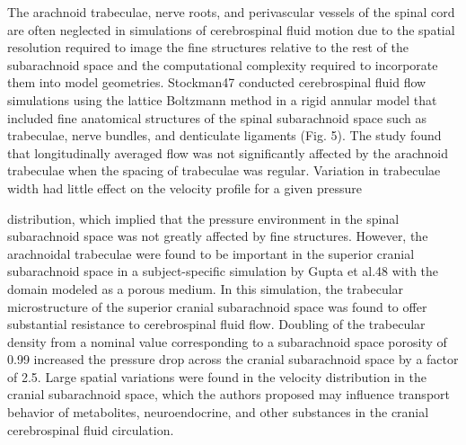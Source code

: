 \documentclass{report}
\begin{document}
The arachnoid trabeculae, nerve roots, and
perivascular vessels of the spinal cord are often
neglected in simulations of cerebrospinal fluid
motion due to the spatial resolution required to
image the fine structures relative to the rest of the
subarachnoid space and the computational complexity
required to incorporate them into model geometries.
Stockman47 conducted cerebrospinal fluid flow
simulations using the lattice Boltzmann method in a
rigid annular model that included fine anatomical
structures of the spinal subarachnoid space such as
trabeculae, nerve bundles, and denticulate ligaments
(Fig. 5). The study found that longitudinally averaged
flow was not significantly affected by the
arachnoid trabeculae when the spacing of trabeculae
was regular. Variation in trabeculae width had little
effect on the velocity profile for a given pressure

distribution, which implied that the pressure environment
in the spinal subarachnoid space was not
greatly affected by fine structures. However, the
arachnoidal trabeculae were found to be important
in the superior cranial subarachnoid space in a
subject-specific simulation by Gupta et al.48 with the
domain modeled as a porous medium. In this
simulation, the trabecular microstructure of the
superior cranial subarachnoid space was found to
offer substantial resistance to cerebrospinal fluid
flow. Doubling of the trabecular density from a
nominal value corresponding to a subarachnoid
space porosity of 0.99 increased the pressure drop
across the cranial subarachnoid space by a factor of
2.5. Large spatial variations were found in the
velocity distribution in the cranial subarachnoid
space, which the authors proposed may influence
transport behavior of metabolites, neuroendocrine,
and other substances in the cranial cerebrospinal
fluid circulation.
\end{document}
